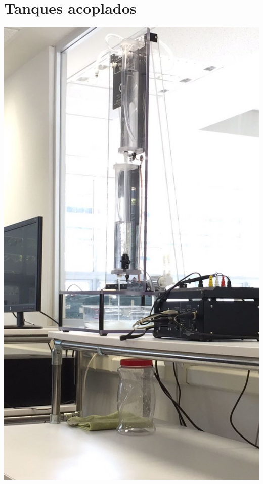\documentclass[12pt,a4paper]{book}
\begin{document}
\section{Tanques acoplados}
\includegraphics[scale=.25]{./2.jpeg}
\end{document}
